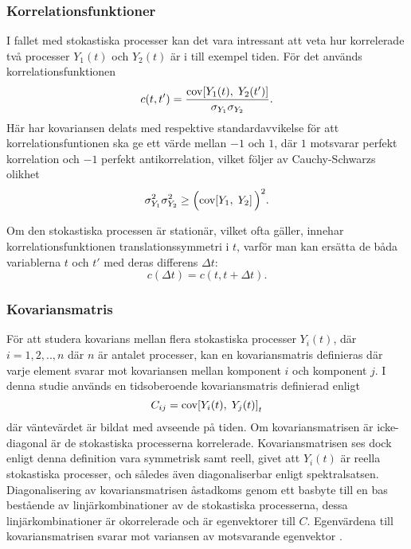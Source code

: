 \subsubsection{Korrelationsfunktioner}
I fallet med stokastiska processer kan det vara intressant att veta
hur korrelerade två processer $Y_1(t)$ och $Y_2(t)$ är i till exempel tiden. För det används
korrelationsfunktionen 
\begin{equation}\label{eq:CORR}
c(t, t') = \frac{\text{cov}\!\left[Y_1(t),\;Y_2(t')\right]}{\sigma_{Y_1}\sigma_{Y_2}}.
\end{equation}
Här har kovariansen delats med respektive standardavvikelse för att
korrelationsfuntionen ska ge ett värde mellan $-1$ och $1$, där $1$ motsvarar perfekt korrelation och $-1$ perfekt antikorrelation, vilket följer av Cauchy-Schwarzs\cite{Engelberg_noise2007} olikhet 
\begin{equation}
\sigma_{Y_1}^2\sigma_{Y_2}^2\geq \Big(\text{cov}\!\left[Y_1,\;Y_2\right]\Big)^2.
\end{equation}

Om den stokastiska processen är stationär, vilket ofta gäller, innehar korrelationsfunktionen
translationssymmetri i $t$, varför man kan
ersätta de båda variablerna $t$ och $t'$ med deras differens $\Delta t$:
\begin{equation}
c(\Delta t) = c(t, t+\Delta t).
\end{equation}

\subsubsection{Kovariansmatris}
För att studera kovarians mellan flera stokastiska processer $Y_i(t)$, där $i=1,2,..,n$ där $n$ är antalet processer, kan en kovariansmatris definieras där varje element svarar mot kovariansen mellan komponent $i$ och komponent $j$. I denna studie används en tidsoberoende kovariansmatris definierad enligt 
\begin{equation}
    C_{ij} = \text{cov}\!\left[Y_i(t),\;Y_j(t)\right]_t
\end{equation}
där väntevärdet är bildat med avseende på tiden. Om kovariansmatrisen är icke-diagonal är de stokastiska processerna korrelerade. Kovariansmatrisen ses dock enligt denna definition vara symmetrisk samt reell, givet att $Y_i(t)$ är reella stokastiska processer, och således även diagonaliserbar enligt spektralsatsen.  Diagonalisering av kovariansmatrisen åstadkoms genom ett basbyte till en bas bestående av linjärkombinationer av de stokastiska processerna, dessa linjärkombinationer är okorrelerade och är egenvektorer till $C$. Egenvärdena till kovariansmatrisen svarar mot variansen av motsvarande egenvektor \cite{Shlens_PCA2014}.

